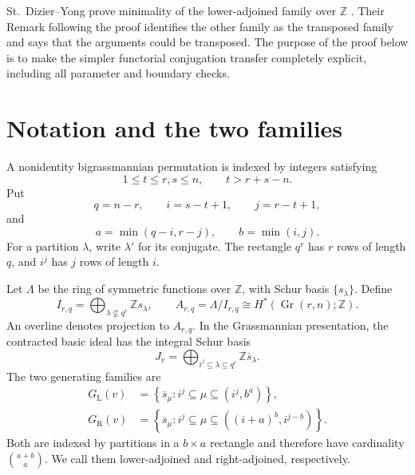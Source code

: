 \documentclass[11pt]{amsart}
\theoremstyle{definition}
\theoremstyle{remark}
\newcommand{\Z}{\mathbb Z}
\newcommand{\Gr}{\operatorname{Gr}}
\newcommand{\GL}{G_{\mathrm L}}
\newcommand{\GR}{G_{\mathrm R}}
\newcommand{\ol}[1]{\overline{#1}}
\begin{document}
St.~Dizier--Yong prove minimality of the lower-adjoined family over $\Z$
\cite{SDY}.  Their Remark following the proof identifies the other family as
the transposed family and says that the arguments could be transposed.  The
purpose of the proof below is to make the simpler functorial conjugation
transfer completely explicit, including all parameter and boundary checks.

\section{Notation and the two families}

A nonidentity bigrassmannian permutation is indexed by integers satisfying
\begin{equation}\label{eq:bigrass-hyp}
  1\leq t\leq r,s\leq n,
  \qquad t>r+s-n.
\end{equation}
Put
\begin{equation}\label{eq:parameters}
  q=n-r,
  \qquad i=s-t+1,
  \qquad j=r-t+1,
\end{equation}
and
\begin{equation}\label{eq:ab}
  a=\min(q-i,r-j),
  \qquad b=\min(i,j).
\end{equation}
For a partition $\lambda$, write $\lambda'$ for its conjugate.  The rectangle
$q^r$ has $r$ rows of length $q$, and $i^j$ has $j$ rows of length $i$.

Let $\Lambda$ be the ring of symmetric functions over $\Z$, with Schur basis
$\{s_\lambda\}$.  Define
\[
  I_{r,q}
  =\bigoplus_{\lambda\nsubseteq q^r}\Z s_\lambda,
  \qquad
  A_{r,q}=\Lambda/I_{r,q}
  \cong H^*(\Gr(r,n);\Z).
\]
An overline denotes projection to $A_{r,q}$.  In the Grassmannian
presentation, the contracted basic ideal has the integral Schur basis
\begin{equation}\label{eq:J-basis}
  J_v
  =\bigoplus_{i^j\subseteq\lambda\subseteq q^r}
    \Z\ol{s}_\lambda.
\end{equation}
The two generating families are
\begin{align}
  \GL(v)
  &=\left\{
    \ol{s}_\mu:
    i^j\subseteq\mu\subseteq(i^j,b^a)
  \right\},\label{eq:GL}\\
  \GR(v)
  &=\left\{
    \ol{s}_\mu:
    i^j\subseteq\mu
    \subseteq((i+a)^b,i^{j-b})
  \right\}.
  \label{eq:GR}
\end{align}
Both are indexed by partitions in a $b\times a$ rectangle and therefore have
cardinality $\binom{a+b}{a}$.  We call them lower-adjoined and
right-adjoined, respectively.
\end{document}

